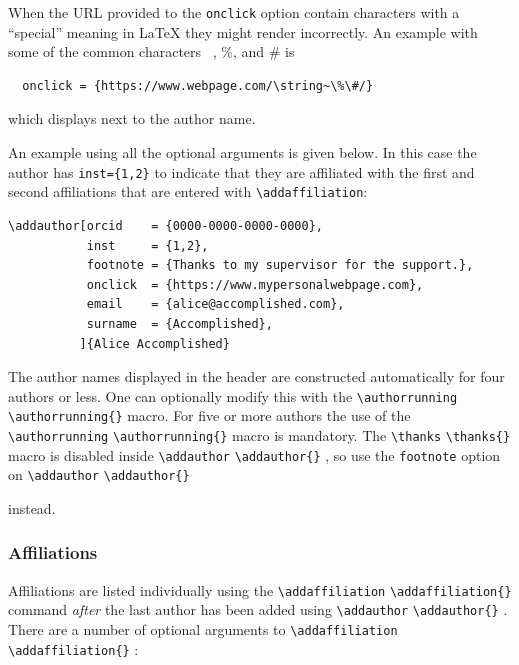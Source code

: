 \documentclass{iacrcc}
\newcommand{\cmd}[2][]{%
  \def\FirstArg{#1}
  \ifx\FirstArg\empty
    \texttt{\textbackslash{}#2}%
  \else
    \texttt{\textbackslash{}#2\{#1\}}%
  \fi
}
\begin{document}
When the URL provided to the {\tt onclick} option contain characters
with a ``special'' meaning in \LaTeX{} they might render incorrectly.
An example with some of the common characters \string~, \%, and \# is
\begin{verbatim}
  onclick = {https://www.webpage.com/\string~\%\#/}
\end{verbatim}
\noindent which displays 
next to the author name.

An example using all the optional arguments is given below. In this case
the author has \verb+inst={1,2}+ to indicate that they are affiliated with
the first and second affiliations that are entered with
\verb+\addaffiliation+:

\begin{verbatim}
\addauthor[orcid    = {0000-0000-0000-0000},
           inst     = {1,2},
           footnote = {Thanks to my supervisor for the support.},
           onclick  = {https://www.mypersonalwebpage.com},
           email    = {alice@accomplished.com},
           surname  = {Accomplished},
          ]{Alice Accomplished}
\end{verbatim}

The author names displayed in the header are constructed automatically
for four authors or less. One can optionally modify this with the
\cmd{authorrunning} macro.  For five or more authors the use of the
\cmd{authorrunning} macro is mandatory. The \cmd{thanks} macro is disabled
inside \cmd{addauthor}, so use the \verb+footnote+ option on \cmd{addauthor}
instead.

\subsubsection{Affiliations}
Affiliations are listed individually using the \cmd{addaffiliation} command
\emph{after} the last author has been added using \cmd{addauthor}.
There are a number of optional arguments to \cmd{addaffiliation}:
\end{document}
